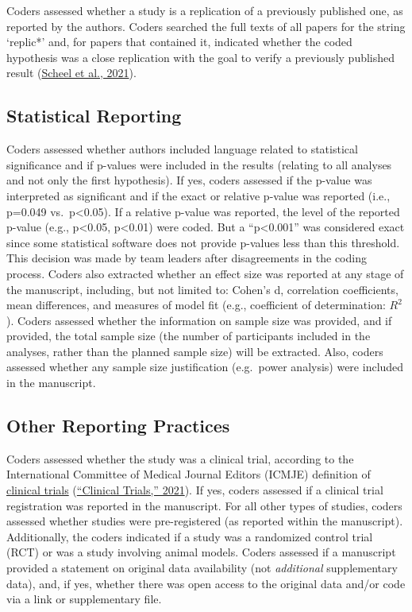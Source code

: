 \documentclass[]{cik}%
\begin{document}
Coders assessed whether a study is a replication of a previously
published one, as reported by the authors. Coders searched the full
texts of all papers for the string `replic*' and, for papers that
contained it, indicated whether the coded hypothesis was a close
replication with the goal to verify a previously published result
(\protect\hyperlink{ref-scheel_excess_2020}{Scheel et al., 2021}).

\hypertarget{statistical-reporting}{%
\subsection{Statistical Reporting}\label{statistical-reporting}}

Coders assessed whether authors included language related to statistical
significance and if p-values were included in the results (relating to
all analyses and not only the first hypothesis). If yes, coders assessed
if the p-value was interpreted as significant and if the exact or
relative p-value was reported (i.e., p=0.049 vs.~p\textless0.05). If a
relative p-value was reported, the level of the reported p-value (e.g.,
p\textless0.05, p\textless0.01) were coded. But a ``p\textless0.001''
was considered exact since some statistical software does not provide
p-values less than this threshold. This decision was made by team
leaders after disagreements in the coding process. Coders also extracted
whether an effect size was reported at any stage of the manuscript,
including, but not limited to: Cohen's d, correlation coefficients, mean
differences, and measures of model fit (e.g., coefficient of
determination: \(R^2\)). Coders assessed whether the information on
sample size was provided, and if provided, the total sample size (the
number of participants included in the analyses, rather than the planned
sample size) will be extracted. Also, coders assessed whether any sample
size justification (e.g.~power analysis) were included in the
manuscript.

\hypertarget{other-reporting-practices}{%
\subsection{Other Reporting Practices}\label{other-reporting-practices}}

Coders assessed whether the study was a clinical trial, according to the
International Committee of Medical Journal Editors (ICMJE) definition of
\href{http://www.icmje.org/recommendations/browse/publishing-and-editorial-issues/clinical-trial-registration.html}{clinical
trials} (\protect\hyperlink{ref-icmje}{{``Clinical Trials,''} 2021}). If
yes, coders assessed if a clinical trial registration was reported in
the manuscript. For all other types of studies, coders assessed whether
studies were pre-registered (as reported within the manuscript).
Additionally, the coders indicated if a study was a randomized control
trial (RCT) or was a study involving animal models. Coders assessed if a
manuscript provided a statement on original data availability (not
\emph{additional} supplementary data), and, if yes, whether there was
open access to the original data and/or code via a link or supplementary
file.
\end{document}

